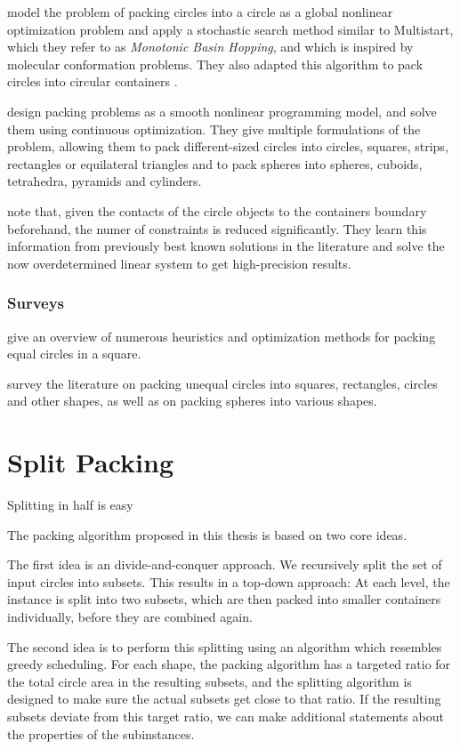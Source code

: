 \documentclass[a4paper,style=print,bibliography=totoc,nexus,lnum,extramargin]{tubsbook}
\begin{document}
\textcite{ALS2008disk} model the problem of packing circles into a circle as a global nonlinear optimization problem and apply a stochastic search method similar to Multistart, which they refer to as \emph{Monotonic Basin Hopping}, and which is inspired by molecular conformation problems. They also adapted this algorithm to pack circles into circular containers \cite{GJLS2009solving}.

\textcite{BS2008minimizing} design packing problems as a smooth nonlinear programming model, and solve them using continuous optimization. They give multiple formulations of the problem, allowing them to pack different-sized circles into circles, squares, strips, rectangles or equilateral triangles and to pack spheres into spheres, cuboids, tetrahedra, pyramids and cylinders.

\textcite{BG2010new} note that, given the contacts of the circle objects to the containers boundary beforehand, the numer of constraints is reduced significantly. They learn this information from previously best known solutions in the literature and solve the now overdetermined linear system to get high-precision results.

\subsection{Surveys}

\textcite{SMCSCG2007new} give an overview of numerous heuristics and optimization methods for packing equal circles in a square.

\textcite{HM2009literature} survey the literature on packing unequal circles into squares, rectangles, circles and other shapes, as well as on packing spheres into various shapes.

\chapter{Split Packing}

Splitting in half is easy

The packing algorithm proposed in this thesis is based on two core ideas.

The first idea is an divide-and-conquer approach. We recursively split the set of input circles into subsets. This results in a top-down approach: At each level, the instance is split into two subsets, which are then packed into smaller containers individually, before they are combined again.

The second idea is to perform this splitting using an algorithm which resembles greedy scheduling. For each shape, the packing algorithm has a targeted ratio for the total circle area in the resulting subsets, and the splitting algorithm is designed to make sure the actual subsets get close to that ratio. If the resulting subsets deviate from this target ratio, we can make additional statements about the properties of the subinstances.
\end{document}
